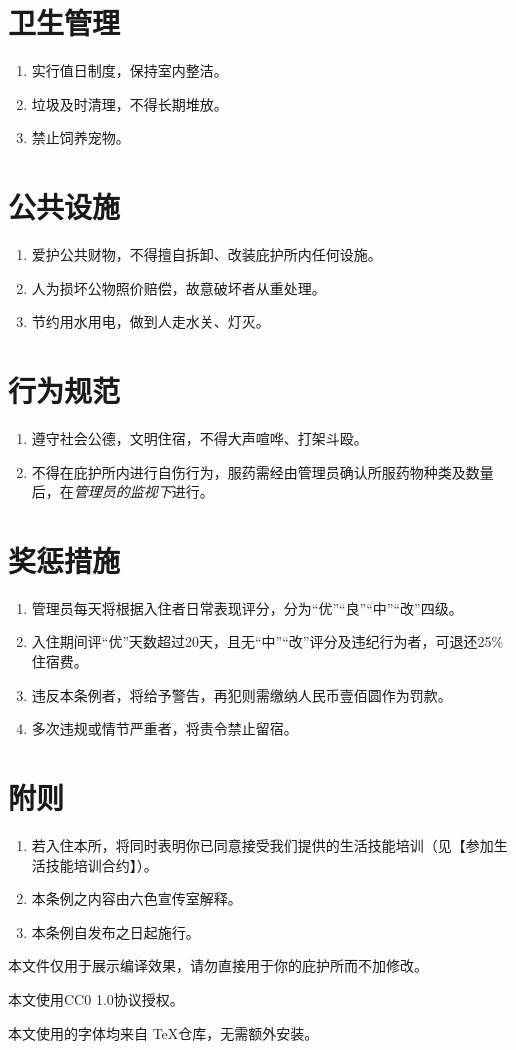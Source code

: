 \documentclass[12pt]{article}
\begin{document}
\section{卫生管理}
\begin{enumerate}
	\item 实行值日制度，保持室内整洁。
	\item 垃圾及时清理，不得长期堆放。
	\item 禁止饲养宠物。
\end{enumerate}

\section{公共设施}
\begin{enumerate}
    \item 爱护公共财物，不得擅自拆卸、改装庇护所内任何设施。
    \item 人为损坏公物照价赔偿，故意破坏者从重处理。
    \item 节约用水用电，做到人走水关、灯灭。
\end{enumerate}

\section{行为规范}
\begin{enumerate}
    \item 遵守社会公德，文明住宿，不得大声喧哗、打架斗殴。
    \item 不得在庇护所内进行自伤行为，服药需经由管理员确认所服药物种类及数量后，在\textit{管理员的监视下}进行。
\end{enumerate}

\section{奖惩措施}
\begin{enumerate}
	\item 管理员每天将根据入住者日常表现评分，分为“优”“良”“中”“改”四级。
    \item 入住期间评“优”天数超过20天，且无“中”“改”评分及违纪行为者，可退还25\%住宿费。
    \item 违反本条例者，将给予警告，再犯则需缴纳人民币壹佰圆作为罚款。
    \item 多次违规或情节严重者，将责令禁止留宿。
\end{enumerate}

\section{附则}
\begin{enumerate}
	\item 若入住本所，将同时表明你已同意接受我们提供的生活技能培训（见【参加生活技能培训合约】）。
    \item 本条例之内容由六色宣传室解释。
    \item 本条例自发布之日起施行。
\end{enumerate}
\newpage
本文件仅用于展示编译效果，请勿直接用于你的庇护所而不加修改。

本文使用CC0 1.0协议授权。

本文使用的字体均来自 \TeX 仓库，无需额外安装。
\end{document}

